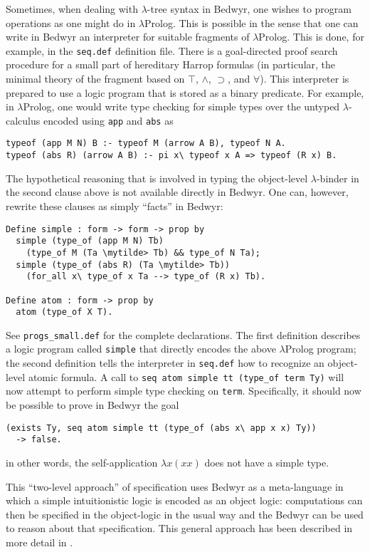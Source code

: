 \documentclass{article}
\newcommand{\mytilde}{\raise.3ex\hbox{$\scriptstyle\sim$}}
\newcommand{\lp}{$\lambda$Prolog}
\begin{document}
Sometimes, when dealing with $\lambda$-tree syntax in Bedwyr, one
wishes to program operations as one might do in \lp{}.  This is possible
in the sense that one can write in Bedwyr an interpreter for suitable
fragments of \lp{}.  This is done, for example, in the {\tt seq.def}
definition file.  There is a goal-directed proof search procedure for a
small part of hereditary Harrop formulas (in particular, the minimal
theory of the fragment based on $\top$, $\wedge$, $\supset$, and
$\forall$).  This interpreter is prepared to use a logic program that
is stored as a binary predicate.  For example, in \lp{}, one would write
type checking for simple types over the untyped $\lambda$-calculus
encoded using {\tt app} and {\tt abs} as
\begin{verbatim}
typeof (app M N) B :- typeof M (arrow A B), typeof N A.
typeof (abs R) (arrow A B) :- pi x\ typeof x A => typeof (R x) B.
\end{verbatim}
The hypothetical reasoning that is involved in typing the object-level
$\lambda$-binder in the second clause above is not available directly
in Bedwyr.  One can, however, rewrite these clauses as simply
``facts'' in Bedwyr:
\begin{Verbatim}
Define simple : form -> form -> prop by
  simple (type_of (app M N) Tb)
    (type_of M (Ta \mytilde> Tb) && type_of N Ta);
  simple (type_of (abs R) (Ta \mytilde> Tb))
    (for_all x\ type_of x Ta --> type_of (R x) Tb).

Define atom : form -> prop by
  atom (type_of X T).
\end{Verbatim}
See \verb+progs_small.def+ for the complete declarations. The first
definition describes a logic program called {\tt simple} that directly
encodes the above \lp{} program; the second definition tells the
interpreter in {\tt seq.def} how to recognize an object-level atomic
formula.  A call to \texttt{seq atom simple tt (type\_of term Ty)} will
now attempt to perform simple type checking on {\tt term}.
Specifically, it should now be possible to prove in Bedwyr the goal
\begin{verbatim}
(exists Ty, seq atom simple tt (type_of (abs x\ app x x) Ty))
  -> false.
\end{verbatim}
in other words, the self-application $\lambda x(x x)$ does not have a
simple type.

This ``two-level approach'' of specification uses Bedwyr as a
meta-language in which a simple intuitionistic logic is encoded as an
object logic: computations can then be specified in the object-logic
in the usual way and the Bedwyr can be used to reason about that specification.
This general approach has been described in more detail in
\cite{miller06ijcar,gacek.twolevel}.
\end{document}
